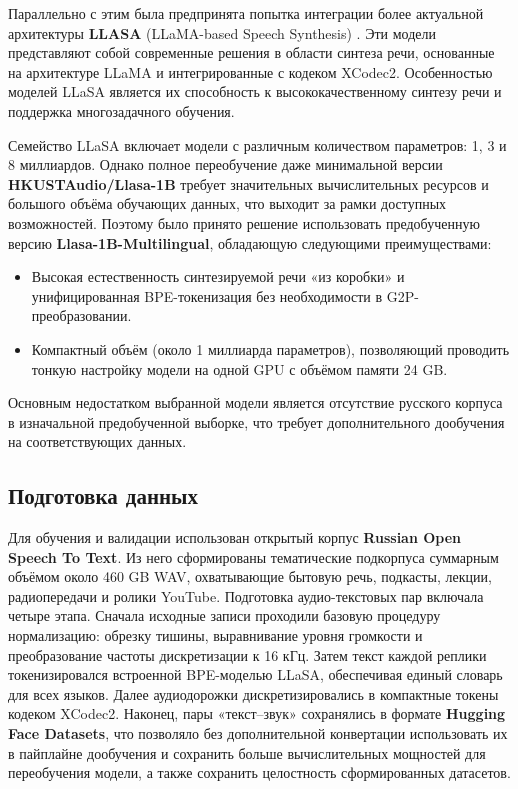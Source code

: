 Параллельно с этим была предпринята попытка интеграции более актуальной архитектуры \textbf{LLASA} (LLaMA-based Speech Synthesis) \cite{ye2025llasa}. Эти модели представляют собой современные
решения в области синтеза речи, основанные на архитектуре LLaMA и интегрированные с кодеком
XCodec2. Особенностью моделей LLaSA является их способность к высококачественному синтезу речи
и поддержка многозадачного обучения.

Семейство LLaSA включает модели с различным количеством параметров: 1, 3 и 8 миллиардов.
Однако полное переобучение даже минимальной версии \textbf{HKUSTAudio/Llasa-1B} требует
значительных вычислительных ресурсов и большого объёма обучающих данных, что выходит за
рамки доступных возможностей. Поэтому было принято решение использовать предобученную
версию \textbf{Llasa-1B-Multilingual}, обладающую следующими преимуществами:

\begin{itemize}
  \item Высокая естественность синтезируемой речи «из коробки» и унифицированная
        BPE-токенизация без необходимости в G2P-преобразовании.
  \item Компактный объём (около 1 миллиарда параметров), позволяющий проводить тонкую
        настройку модели на одной GPU с объёмом памяти 24 GB.
\end{itemize}

Основным недостатком выбранной модели является отсутствие русского корпуса в изначальной
предобученной выборке, что требует дополнительного дообучения на соответствующих данных.

\subsection{Подготовка данных}

Для обучения и валидации использован открытый корпус  
\textbf{Russian Open Speech To Text}. Из него сформированы  
тематические подкорпуса суммарным объёмом около 460 GB WAV, охватывающие  
бытовую речь, подкасты, лекции, радиопередачи и ролики YouTube. Подготовка  
аудио-текстовых пар включала четыре этапа. Сначала исходные записи проходили  
базовую процедуру нормализацию: обрезку тишины, выравнивание уровня громкости и  
преобразование частоты дискретизации к 16 кГц. Затем текст каждой реплики  
токенизировался встроенной BPE-моделью LLaSA, обеспечивая единый словарь для  
всех языков. Далее аудиодорожки дискретизировались в компактные токены  
кодеком XCodec2. Наконец, пары «текст–звук» сохранялись в формате  
\textbf{Hugging Face Datasets}, что позволяло без дополнительной конвертации  
использовать их в пайплайне дообучения и сохранить больше вычислительных мощностей 
для переобучения модели, а также сохранить целостность сформированных датасетов. 

